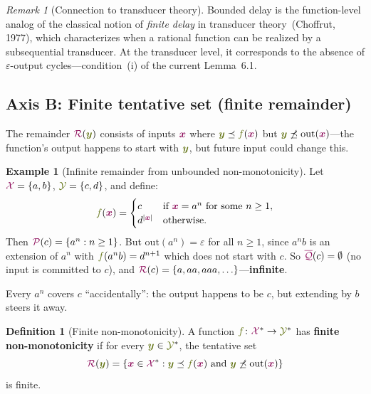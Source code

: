 \documentclass{article}
\newcommand{\defn}[1]{\textbf{#1}}
\newcommand{\preCover}{{\color{TokenColor}\mathcal{P}}}
\newcommand{\maxQuotient}{{\color{TokenColor}\overline{\mathcal{Q}}}}
\newcommand{\Remainder}{{\color{TokenColor}\mathcal{R}}}
\newcommand{\transFnSym}[0]{f}
\newcommand{\transFn}{\ensuremath{{\color{CharacterColor}\transFnSym}}\xspace}
\newcommand{\srcStr}{\ensuremath{{\color{TokenColor}\boldsymbol{x}}}\xspace}
\newcommand{\tgtStr}{{\color{CharacterColor}\boldsymbol{y}}}
\newcommand{\srcAlphabet}[0]{{\color{TokenColor}\ensuremath{\mathcal{X}}}\xspace}
\newcommand{\tgtAlphabet}[0]{{\color{CharacterColor}\ensuremath{\mathcal{Y}}}\xspace}
\newcommand{\srcStrings}[0]{\ensuremath{\srcAlphabet^*}\xspace}
\newcommand{\tgtStrings}[0]{\ensuremath{\tgtAlphabet^*}\xspace}
\newcommand{\committed}{\mathrm{out}}
\theoremstyle{plain}
\theoremstyle{definition}
\newtheorem{definition}[theorem]{Definition}
\newtheorem{example}[theorem]{Example}
\theoremstyle{remark}
\newtheorem{remark}[theorem]{Remark}
\begin{document}
\begin{remark}[Connection to transducer theory]
Bounded delay is the function-level analog of the classical notion of
\emph{finite delay} in transducer theory~(Choffrut, 1977), which
characterizes when a rational function can be realized by a subsequential
transducer.  At the transducer level, it corresponds to the absence of
$\varepsilon$-output cycles---condition~(i) of the current Lemma~6.1.
\end{remark}


\subsection{Axis B: Finite tentative set (finite remainder)}

The remainder $\Remainder(\tgtStr)$ consists of inputs $\srcStr$ where
$\tgtStr \preceq \transFn(\srcStr)$ but $\tgtStr \not\preceq
\committed(\srcStr)$---the function's output happens to start with $\tgtStr$,
but future input could change this.

\begin{example}[Infinite remainder from unbounded non-monotonicity]
\label{ex:infinite-R}
Let $\srcAlphabet = \{a, b\}$, $\tgtAlphabet = \{c, d\}$, and define:
\[
  \transFn(\srcStr) = \begin{cases}
    c & \text{if } \srcStr = a^n \text{ for some } n \geq 1, \\
    d^{|\srcStr|} & \text{otherwise.}
  \end{cases}
\]
Then $\preCover(c) = \{a^n : n \geq 1\}$.  But $\committed(a^n) = \varepsilon$
for all $n \geq 1$, since $a^n b$ is an extension of $a^n$ with
$\transFn(a^n b) = d^{n+1}$ which does not start with $c$.  So
$\maxQuotient(c) = \emptyset$ (no input is committed to $c$), and
$\Remainder(c) = \{a, aa, aaa, \ldots\}$---\textbf{infinite}.

Every $a^n$ covers $c$ ``accidentally'': the output happens to be $c$, but
extending by $b$ steers it away.
\end{example}

\begin{definition}[Finite non-monotonicity]
\label{def:finite-nonmonotone}
A function $\transFn \colon \srcStrings \to \tgtStrings$ has \defn{finite
non-monotonicity} if for every $\tgtStr \in \tgtStrings$, the tentative set
\[
  \Remainder(\tgtStr) = \{\srcStr \in \srcStrings : \tgtStr \preceq \transFn(\srcStr) \text{ and } \tgtStr \not\preceq \committed(\srcStr)\}
\]
is finite.
\end{definition}
\end{document}
